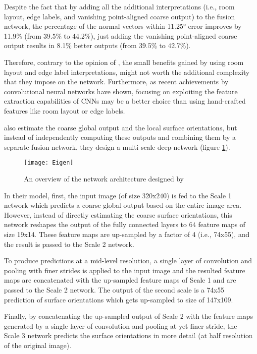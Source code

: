 Despite the fact that by adding all the additional interpretations (i.e., room layout, edge labels, and vanishing point-aligned coarse output) to the fusion network, the percentage of the normal vectors within \ang{11.25} error improves by 11.9\% (from 39.5\% to 44.2\%), just adding the vanishing point-aligned coarse output results in 8.1\% better outputs (from 39.5\% to 42.7\%). 

Therefore, contrary to the opinion of \citeauthor*{wang}, the small benefits gained by using room layout and edge label interpretations, might not worth the additional complexity that they impose on the network. Furthermore, as recent achievements by convolutional neural networks have shown, focusing on exploiting the feature extraction capabilities of CNNs may be a better choice than using hand-crafted features like room layout or edge labels.     

\citeauthor*{eigen} \cite{eigen} also estimate the coarse global output and the local surface orientations, but instead of independently computing these outputs and combining them by a separate fusion network, they design a multi-scale deep network (figure \ref{fig:eigen}). 

\begin{figure}[h]
    \centering
    \texttt{[image: Eigen]}
    \caption{An overview of the network architecture designed by \citeauthor*{eigen} \cite{eigen}}
    \label{fig:eigen}
\end{figure}

In their model, first, the input image (of size 320x240) is fed to the Scale 1 network which predicts a coarse global output based on the entire image area. However, instead of directly estimating the coarse surface orientations, this network reshapes the output of the fully connected layers to 64 feature maps of size 19x14. These feature maps are up-sampled by a factor of 4 (i.e., 74x55), and the result is passed to the Scale 2 network. 

To produce predictions at a mid-level resolution, a single layer of convolution and pooling with finer strides is applied to the input image and the resulted feature maps are concatenated with the up-sampled feature maps of Scale 1 and are passed to the Scale 2 network. The output of the second scale is a 74x55 prediction of surface orientations which gets up-sampled to size of 147x109. 

Finally, by concatenating the up-sampled output of Scale 2 with the feature maps generated by a single layer of convolution and pooling at yet finer stride, the Scale 3 network predicts the surface orientations in more detail (at half resolution of the original image). 

